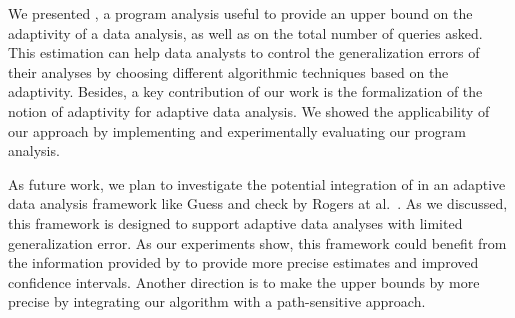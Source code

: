 We presented {\THESYSTEM}, a program analysis useful to provide an upper bound on the adaptivity of a data analysis, as well as on the total number of queries asked. This estimation can help data analysts to control the generalization errors of their analyses by choosing different algorithmic techniques based on the adaptivity. Besides, a key contribution of our work is the formalization of the notion of adaptivity for adaptive data analysis. We showed the applicability of our approach by implementing and experimentally evaluating our program analysis.

As future work, we plan to investigate the potential integration of  {\THESYSTEM} in an adaptive data analysis framework like Guess and check by Rogers at al.~\cite{RogersRSSTW20}. As we discussed, this framework is  designed to support adaptive data analyses with limited generalization error. As our experiments show, this framework could benefit from the information provided by {\THESYSTEM} to provide more precise estimates and improved confidence intervals. Another direction is to make 
the upper bounds by {\THESYSTEM} more precise by integrating our algorithm with a path-sensitive approach.


